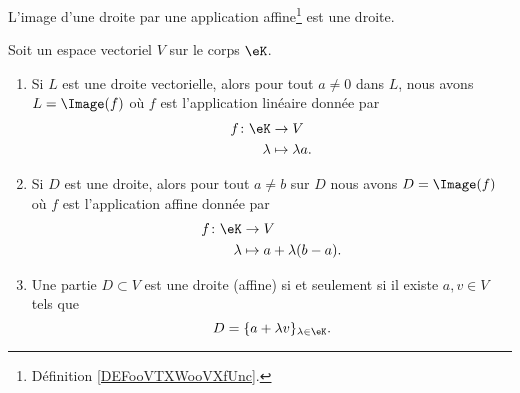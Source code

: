 \begin{proposition}     \label{PROPooNTHVooWWyafJ}
	L'image d'une droite par une application affine\footnote{Définition \ref{DEFooVTXWooVXfUnc}.} est une droite.
\end{proposition}

\begin{lemma}       \label{LEMooRWASooOfwjdw}
	Soit un espace vectoriel \( V\) sur le corps \( \eK\).
	\begin{enumerate}
		\item       \label{ITEMooYQCIooOrhRwj}
		      Si \( L\) est une droite vectorielle, alors pour tout \( a\neq 0\) dans \( L\), nous avons \( L=\Image(f)\) où \( f\) est l'application linéaire donnée par
		      \begin{equation}
			      \begin{aligned}
				      f\colon \eK & \to V              \\
				      \lambda     & \mapsto \lambda a.
			      \end{aligned}
		      \end{equation}
		\item       \label{ITEMooZIGMooGruFMP}
		      Si \( D\) est une droite, alors pour tout \( a\neq b\) sur \( D\) nous avons \( D=\Image(f)\) où \( f\) est l'application affine donnée par
		      \begin{equation}
			      \begin{aligned}
				      f\colon \eK & \to V                   \\
				      \lambda     & \mapsto a+\lambda(b-a).
			      \end{aligned}
		      \end{equation}
		\item     \label{ITEMooOKJZooIHYDIk}
		      Une partie \( D\subset V\) est une droite (affine) si et seulement si il existe \( a,v\in V\) tels que
		      \begin{equation}
			      D=\{ a+\lambda v \}_{\lambda\in \eK}.
		      \end{equation}
	\end{enumerate}
\end{lemma}

